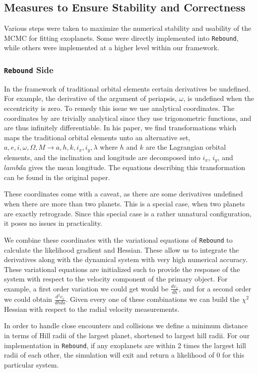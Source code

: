 \documentclass{aa}
\begin{document}
\subsection{Measures to Ensure Stability and Correctness}
Various steps were taken to maximize the numerical stability and usability of the MCMC for fitting exoplanets. Some were directly implemented into \texttt{Rebound}, while others were implemented at a higher level within our framework.

\subsubsection{\texttt{Rebound} Side}\label{analytical}
In the framework of traditional orbital elements certain derivatives be undefined. For example, the derivative of the argument of periapsis, $\omega$, is undefined when the eccentricity is zero. To remedy this issue we use analytical coordinates. The coordinates by \cite{Pl2009} are trivially analytical since they use trigonometric functions, and are thus infinitely differentiable. In his paper, we find transformations which maps the traditional orbital elements unto an alternative set, $a, e, i, \omega, \Omega, M \to a, h, k, i_x, i_y, \lambda$ where $h$ and $k$ are the Lagrangian orbital elements, and the inclination and longitude are decomposed into $i_x$, $i_y$, and $lambda$ gives the mean longitude. The equations describing this transformation  can be found in the original paper. 

These coordinates come with a caveat, as there are some derivatives undefined when there are more than two planets. This is a special case, when two planets are exactly retrograde. Since this special case is a rather unnatural configuration, it poses no issues in practicality.

We combine these coordinates with the variational equations of \texttt{Rebound} to calculate the likelihood gradient and Hessian. These allow us to integrate the derivatives along with the dynamical system with very high numerical accuracy. These variational equations are initialized such to provide the response of the system with respect to the velocity component of the primary object. For example, a first order variation we could get would be $\frac{dv_x}{dh}$, and for a second order we could obtain $\frac{d^2v_x}{dhda}$. Given every one of these combinations we can build the $\chi^2$ Hessian with respect to the radial velocity measurements.

In order to handle close encounters and collisions we define a minimum distance in terms of Hill radii of the largest planet, shortened to largest hill radii. For our implementation in \texttt{Rebound}, if any exoplanets are within 2 times the largest hill radii of each other, the simulation will exit and return a likelihood of $0$ for this particular system. 
\end{document}
